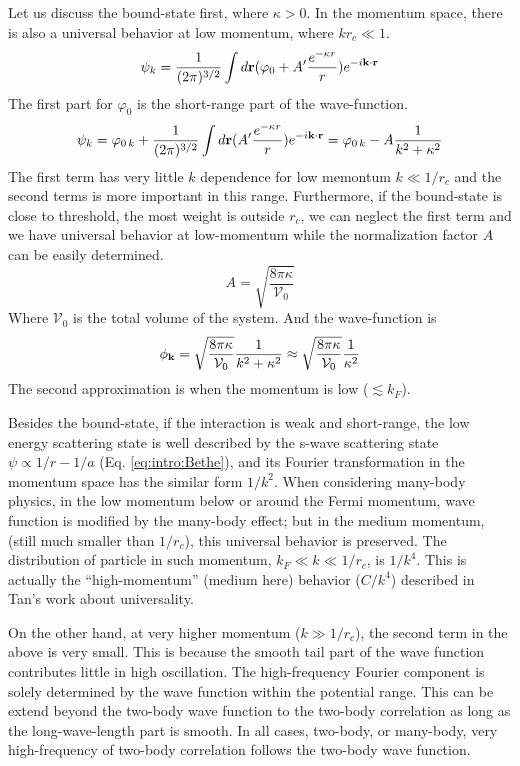 Let us discuss the bound-state first, where $\kappa>0$.  In the momentum space, there is also a universal behavior at low momentum, where $kr_{c}\ll1$.   
\begin{equation*}
\psi_{k}=\frac{1}{(2\pi)^{3/2}}\int{d\ensuremath{\mathbf{r}}}(\varphi_{0}+A'\frac{e^{-\kappa{r}}}{r})e^{-i\mathbf{k}\cdot\mathbf{r}}
\end{equation*}
The first part for $\varphi_{0}$ is the short-range part of the wave-function. 
\begin{equation*}
\psi_{k}=\varphi_{0\,k}+\frac{1}{(2\pi)^{3/2}}\int{d\ensuremath{\mathbf{r}}}(A'\frac{e^{-\kappa{r}}}{r})e^{-i\mathbf{k}\cdot\mathbf{r}}=\varphi_{0\,k}-A\frac{1}{k^{2}+\kappa^{2}}
\end{equation*}
The first term has  very little $k$ dependence for low memontum $k\ll1/r_{c}$ and the second terms is more important in this range. 
Furthermore, if the bound-state is  close to threshold, the most weight is outside $r_{c}$, we can neglect the first term and we have universal behavior at low-momentum while the normalization factor $A$ can be easily determined.
\begin{equation}
A=\sqrt{\frac{8\pi\kappa}{\mathcal{V}_{0}}}
\end{equation}
Where $\mathcal{V}_{0}$ is the total volume of the system. And the wave-function is
\begin{equation}\label{eq:pathInt2:phi2body}
\phi_{\mathbf{k}}=\sqrt{\frac{8\pi\kappa}{\mathcal{V}_{0}}}\frac{1}{k^{2}+\kappa^{2}}\approx\sqrt{\frac{8\pi\kappa}{\mathcal{V}_{0}}}\frac{1}{\kappa^{2}}
\end{equation}
The second approximation is when the momentum is low ($\lesssim{}k_{F}$).

   Besides  the bound-state, if the interaction is weak and short-range, the low energy scattering state is well described by the s-wave scattering state $\psi\propto1/r-1/a$ (Eq. \ref{eq:intro:Bethe}), and its Fourier transformation in the momentum space has the similar form $1/k^{2}$.  When considering many-body physics, in the low momentum below or around the Fermi momentum,  wave function  is modified by the many-body effect; but in the medium momentum, (still much smaller than $1/r_{c}$), this universal behavior is preserved.  The distribution of particle in such momentum, $k_{F}\ll{k}\ll{1/r_{c}}$, is $1/k^{4}$. This is actually the ``high-momentum'' (medium here) behavior ($C/k^{4}$) described in Tan's work about universality\cite{Tan2008-1,Tan2008-2}. 

On the other hand, at very higher momentum ($k\gg1/r_{c}$), the second term in the above is very small.  This is because the smooth tail part of the wave function contributes little in high oscillation.  The high-frequency Fourier component is solely determined by the wave function within the potential range.   This can be extend beyond the two-body wave function to the two-body correlation as long as the long-wave-length part is smooth.  In all cases, two-body, or many-body, very high-frequency of two-body correlation follows the two-body wave function.  

